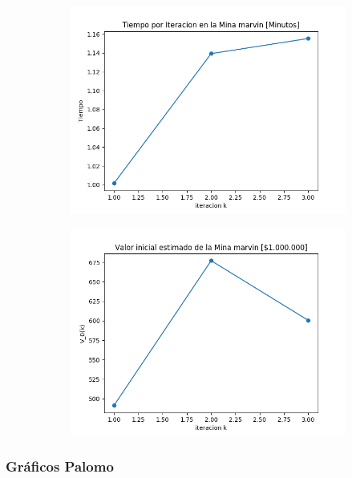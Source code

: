 \documentclass[12pt,letterpaper]{article}
\begin{document}
\begin{figure}[H]
  \begin{subfigure}[b]{0.4\textwidth}
     \includegraphics[width=\textwidth]{Graficos/sin_filtrar/restringido/marvinml_inc_times.png}
     \caption{}
     \label{fig:ex1}
  \end{subfigure}
  \begin{subfigure}[b]{0.4\textwidth}
     \includegraphics[width=\textwidth]{Graficos/sin_filtrar/restringido/marvinml_inc_v_k.png}
     \caption{}
     \label{fig:ex2}
  \end{subfigure}
\end{figure}

\newpage

\subsubsection{Gráficos Palomo}
\end{document}
